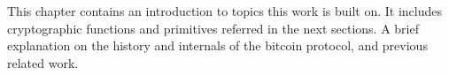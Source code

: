 \begin{mychapterabstract}
        This chapter contains an introduction to topics this work is built
        on.
        It includes cryptographic functions and primitives referred in the
        next sections.
        A brief explanation on the history and internals of the bitcoin
        protocol, and previous related work.
\end{mychapterabstract}
